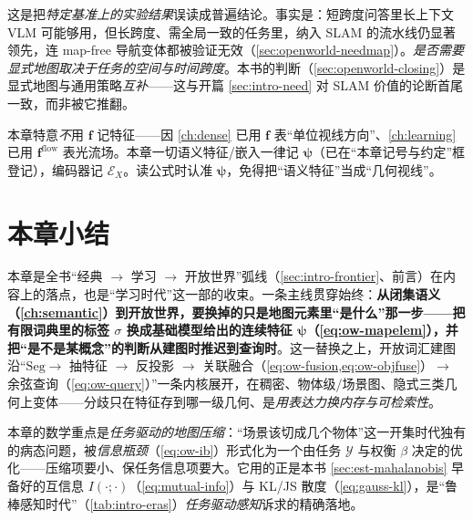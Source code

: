 \begin{pitfall}
这是把\emph{特定基准上的实验结果}误读成普遍结论。事实是：短跨度问答里长上下文 VLM 可能够用，但长跨度、需全局一致的任务里，纳入 SLAM 的流水线仍显著领先，连 map-free 导航变体都被验证无效（\cref{sec:openworld-needmap}）。\emph{是否需要显式地图取决于任务的空间与时间跨度}。本书的判断（\cref{sec:openworld-closing}）是显式地图与通用策略\emph{互补}——这与开篇 \cref{sec:intro-need} 对 SLAM 价值的论断首尾一致，而非被它推翻。
\end{pitfall}

\begin{pitfall}
本章特意\emph{不}用 $\mathbf{f}$ 记特征——因 \cref{ch:dense} 已用 $\mathbf{f}$ 表“单位视线方向”、\cref{ch:learning} 已用 $\mathbf{f}^{\mathrm{flow}}$ 表光流场。本章一切语义特征/嵌入一律记 $\boldsymbol\psi$（已在“本章记号与约定”框登记），编码器记 $\mathcal{E}_X$。读公式时认准 $\boldsymbol\psi$，免得把“语义特征”当成“几何视线”。
\end{pitfall}

\section*{本章小结}

本章是全书“经典 $\to$ 学习 $\to$ 开放世界”弧线（\cref{sec:intro-frontier}、前言）在内容上的落点，也是“学习时代”这一部的收束。一条主线贯穿始终：\textbf{从闭集语义（\cref{ch:semantic}）到开放世界，要换掉的只是地图元素里“是什么”那一步——把有限词典里的标签 $\sigma$ 换成基础模型给出的连续特征 $\boldsymbol\psi$（\cref{eq:ow-mapelem}），并把“是不是某概念”的判断从建图时推迟到查询时}。这一替换之上，开放词汇建图沿“$\mathrm{Seg}\to$ 抽特征 $\to$ 反投影 $\to$ 关联融合（\cref{eq:ow-fusion,eq:ow-objfuse}）$\to$ 余弦查询（\cref{eq:ow-query}）”一条内核展开，在稠密、物体级/场景图、隐式三类几何上变体——分歧只在特征存到哪一级几何、是\emph{用表达力换内存与可检索性}。

本章的数学重点是\emph{任务驱动的地图压缩}：“场景该切成几个物体”这一开集时代独有的病态问题，被\emph{信息瓶颈}（\cref{eq:ow-ib}）形式化为一个由任务 $\mathcal{Y}$ 与权衡 $\beta$ 决定的优化——压缩项要小、保任务信息项要大。它用的正是本书 \cref{sec:est-mahalanobis} 早备好的互信息 $I(\cdot;\cdot)$（\cref{eq:mutual-info}）与 KL/JS 散度（\cref{eq:gauss-kl}），是“鲁棒感知时代”（\cref{tab:intro-eras}）\emph{任务驱动感知}诉求的精确落地。

